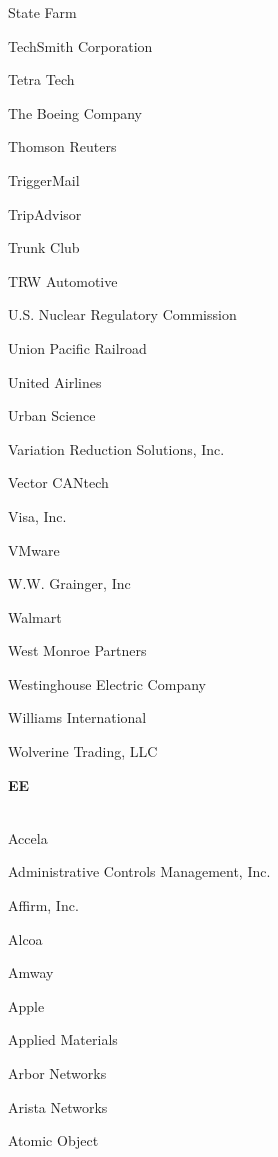 \documentclass[twoside]{article}
\begin{document}
\begin{center}
\begin{multicols}{5}
\begin{FlushLeft}
\begin{compactitem}
\item State Farm
\item TechSmith Corporation
\item Tetra Tech
\item The Boeing Company
\item Thomson Reuters
\item TriggerMail
\item TripAdvisor
\item Trunk Club
\item TRW Automotive
\item U.S. Nuclear Regulatory Commission
\item Union Pacific Railroad
\item United Airlines
\item Urban Science
\item Variation Reduction Solutions, Inc.
\item Vector CANtech
\item Visa, Inc.
\item VMware
\item W.W. Grainger, Inc
\item Walmart
\item West Monroe Partners
\item Westinghouse Electric Company
\item Williams International
\item Wolverine Trading, LLC
\end{compactitem}
        \end{FlushLeft}
        \vspace{1em}
        {\fontsize{14}{16}\selectfont \bf EE}\\
        \vspace{-1em}
        ~\hrulefill~
        \vspace{-.9em}
        \begin{FlushLeft}
        \begin{compactitem}
        \item Accela
\item Administrative Controls Management, Inc.
\item Affirm, Inc.
\item Alcoa
\item Amway
\item Apple
\item Applied Materials
\item Arbor Networks
\item Arista Networks
\item Atomic Object

\end{compactitem}
\end{FlushLeft}
\end{multicols}
\end{center}
\end{document}
